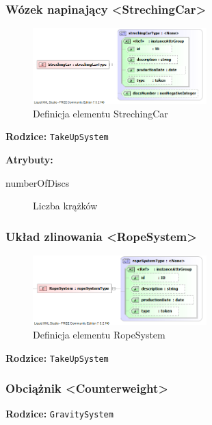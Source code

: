 \documentclass[12pt,a4paper]{article}
\begin{document}
\subsubsection{Wózek napinający <StrechingCar>}

\begin{figure}[H]
  \centering
  \includegraphics[width=0.6\textwidth]{png/liquid/StrechingCar}
  \caption{Definicja elementu StrechingCar}
  \label{fig:strechingCar-xsd}
\end{figure}

\noindent\textbf{Rodzice:} \texttt{TakeUpSystem}

\noindent\textbf{Atrybuty:}
\begin{description}
\item[numberOfDiscs] Liczba krążków
\end{description}


\subsubsection{Układ zlinowania <RopeSystem>}

\begin{figure}[H]
  \centering
  \includegraphics[width=0.6\textwidth]{png/liquid/RopeSystem}
  \caption{Definicja elementu RopeSystem}
  \label{fig:ropeSystem-xsd}
\end{figure}

\noindent\textbf{Rodzice:} \texttt{TakeUpSystem}


\subsubsection{Obciążnik <Counterweight>}

\noindent\textbf{Rodzice:} \texttt{GravitySystem}
\end{document}
